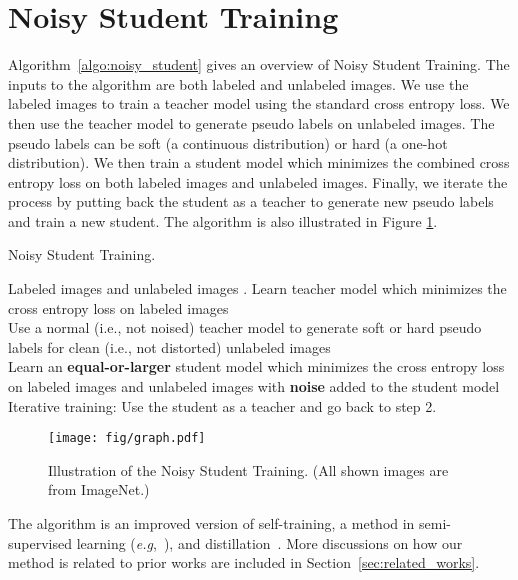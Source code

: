 \documentclass[10pt,twocolumn,letterpaper]{article}
\def\eg{\emph{e.g}\onedot}
\begin{document}
\section{Noisy Student Training}
\label{sec:method}
Algorithm~\ref{algo:noisy_student} gives an overview of  Noisy Student Training.
The inputs to the algorithm are both labeled and unlabeled images. We use the labeled images to train a teacher model using the standard cross entropy loss. We then use the teacher model to generate pseudo labels on unlabeled images. The pseudo labels can be soft (a continuous distribution) or hard (a one-hot distribution). We then train a student model which minimizes the combined cross entropy loss on both labeled images and unlabeled images. Finally, we iterate the process by putting back the student as a teacher to generate new pseudo labels and train a new student. The algorithm is also illustrated in Figure \ref{fig:noisy_student}.

\begin{algorithm}
\small
	\caption{Noisy Student Training.}
	\label{algo:noisy_student}
	\begin{algorithmic}[1]
		\REQUIRE 
		Labeled images  and unlabeled images .
		\STATE  Learn teacher model  which minimizes the cross entropy loss on labeled images   \\ 
		\STATE Use a normal (i.e., not noised) teacher model to generate soft or hard pseudo labels for clean (i.e., not distorted) unlabeled images  \\
		\STATE Learn an {\bf equal-or-larger} student model  which minimizes the cross entropy loss on labeled images and unlabeled images with {\bf noise} added to the student model \\
		\STATE Iterative training: Use the student as a teacher and go back to step 2.
	\end{algorithmic}
\end{algorithm}


\begin{figure}[h!]
    \centering
    \texttt{[image: fig/graph.pdf]}
    \caption{Illustration of the Noisy Student Training. (All shown images are from ImageNet.) }
    \label{fig:noisy_student}
\end{figure}

The algorithm is an improved version of self-training, a
 method in semi-supervised learning (\eg,~\cite{scudder1965probability,yarowsky1995unsupervised}), and distillation~\cite{hinton2015distilling}. 
More discussions on how our method is related to prior works are included in Section~\ref{sec:related_works}.
\end{document}
